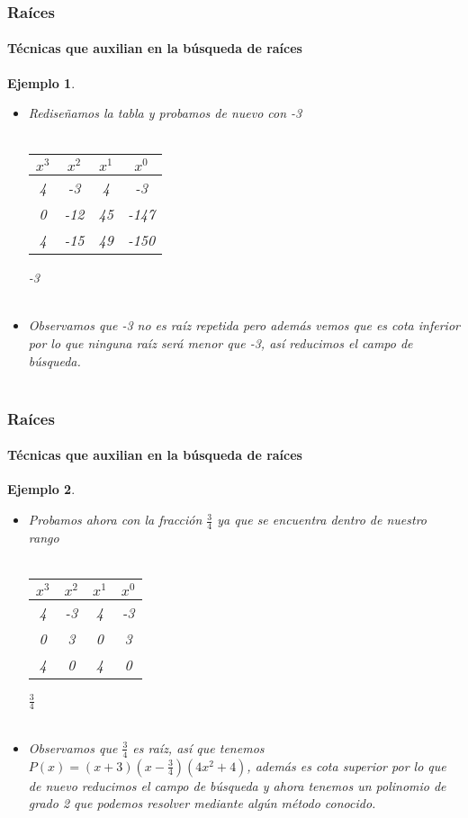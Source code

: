 \documentclass[11pt]{beamer}
\newtheorem{ejem}{Ejemplo}
\begin{document}
\begin{frame}
\frametitle{Raíces}
\framesubtitle{Técnicas que auxilian en la búsqueda de raíces}
\begin{ejem}
\begin{itemize}
\item Rediseñamos la tabla y probamos de nuevo con -3\\ \hspace{0cm} \\
\begin{tabular}{c|c|c|c|}
$x^3$ & $x^2$ & $x^1$ & $x^0$\\ \hline
4 & -3 & 4 & -3\\ 
0 & -12 & 45 & -147 \\ \hline
4 & -15 & 49 & -150
\end{tabular}
-3\\ \hspace{0cm} \\
\item Observamos que -3 no es raíz repetida pero además vemos que es cota inferior por lo que ninguna raíz será menor que -3, así reducimos el campo de búsqueda.\\ \hspace{0cm} \\
\end{itemize}
\end{ejem}
\end{frame}

\begin{frame}
\frametitle{Raíces}
\framesubtitle{Técnicas que auxilian en la búsqueda de raíces}
\begin{ejem}
\begin{itemize}
\item Probamos ahora con la fracción $\frac{3}{4}$ ya que se encuentra dentro de nuestro rango\\ \hspace{0cm} \\
\begin{tabular}{c|c|c|c|}
$x^3$ & $x^2$ & $x^1$ & $x^0$\\ \hline
4 & -3 & 4 & -3\\ 
0 & 3 & 0 & 3 \\ \hline
4 & 0 & 4 & 0
\end{tabular}
$\frac{3}{4}$\\ \hspace{0cm} \\
\item Observamos que $\frac{3}{4}$ es raíz, así que tenemos $P(x) = (x+3)(x-\frac{3}{4})(4x^2 + 4)$, además es cota superior por lo que de nuevo reducimos el campo de búsqueda y ahora tenemos un polinomio de grado 2 que podemos resolver mediante algún método conocido.\\ \hspace{0cm} \\
\end{itemize}
\end{ejem}
\end{frame}
\end{document}
